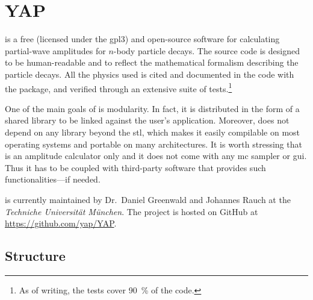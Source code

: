 \chapter{YAP}

     is a free (licensed under the \acs{gpl3}) and open-source \cpp[11] software for calculating partial-wave amplitudes for $n$-body particle decays.
    The source code is designed to be human-readable and to reflect the mathematical formalism describing the particle decays.
    All the physics used is cited and documented in the code with the  package, and verified through an extensive suite of tests.\footnote{As of writing, the tests cover \SI{90}{\percent} of the code.}

    One of the main goals of  is modularity.
    In fact, it is distributed in the form of a shared library to be linked against the user's application.
    Moreover,  does not depend on any library beyond the \cpp{} \ac{stl}, which makes it easily compilable on most operating systems and portable on many architectures.
    It is worth stressing that   is an amplitude calculator only and it does not come with any \ac{mc} sampler or \acs{gui}.
    Thus it has to be coupled with third-party software that provides such functionalities---if needed.


     is currently maintained by Dr.~Daniel Greenwald and Johannes Rauch at the \textsl{Techniche Universit\"at M\"unchen}.
    The project is hosted on \textsf{GitHub} at \url{https://github.com/yap/YAP}.
 

%
%

    \section{Structure}

